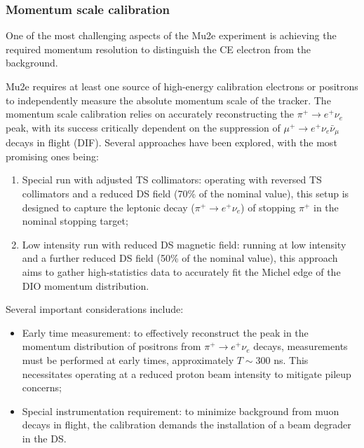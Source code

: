 \subsubsection{Momentum scale calibration}
One of the most challenging aspects of the Mu2e experiment is achieving the 
required momentum resolution to distinguish the CE electron from the background.

Mu2e requires at least one source of high-energy calibration electrons or 
positrons to independently measure the absolute momentum scale of the tracker. 
The momentum scale calibration relies on accurately reconstructing the 
$\pi^+ \rightarrow e^+ \nu_e$ peak, with its success critically dependent on the 
suppression of $\mu^+ \rightarrow e^+ \nu_e \bar{\nu}_\mu$ decays in flight (DIF). 
Several approaches have been explored, with the most promising ones being:

\begin{enumerate}
    \item Special run with adjusted TS collimators: operating with 
    reversed TS collimators and a reduced DS field 
    (70\% of the nominal value), this setup is designed to capture the 
    leptonic decay ($\pi^+ \rightarrow e^+ \nu_e$) of stopping $\pi^+$ in the nominal stopping target;
    
    \item Low intensity run with reduced DS magnetic field: 
    running at low intensity and a further reduced DS field (50\% of the nominal value), 
    this approach aims to gather high-statistics data to accurately fit 
    the Michel edge of the DIO momentum distribution.
\end{enumerate}

Several important considerations include:

\begin{itemize}
    \item Early time measurement: to effectively 
    reconstruct the peak in the momentum distribution 
    of positrons from $\pi^+ \rightarrow e^+ \nu_e$ decays, 
    measurements must be performed at early times, approximately 
    $T \sim 300$ ns. This necessitates operating at a reduced proton 
    beam intensity to mitigate pileup concerns;
    
    \item Special instrumentation requirement: to minimize 
    background from muon decays in flight, the calibration demands 
    the installation of a beam degrader in the DS.
\end{itemize}

